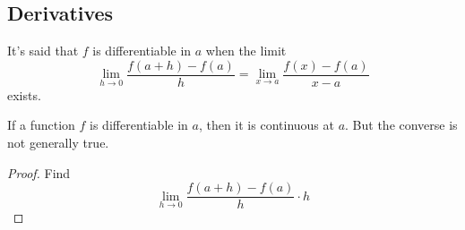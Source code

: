 \documentclass[../main.tex]{subfiles}
\begin{document}
\subsection{Derivatives}

\begin{definition}[Differentiable]
    It's said that $f$ is differentiable in $a$ when the limit
    $$
    \lim_{h\rightarrow 0} \frac{f(a+h)-f(a)}{h} = \lim_{x\rightarrow a} \frac{f(x)-f(a)}{x-a}
    $$
    exists.
\end{definition}
\begin{theorem}
    If a function $f$ is differentiable in $a$, then it is continuous at $a$. But the converse is not generally true.
\end{theorem}
\begin{proof}
    Find
    $$\lim_{h \rightarrow 0} \frac{f(a+h) - f(a)}{h}\cdot h$$
\end{proof}
\end{document}
